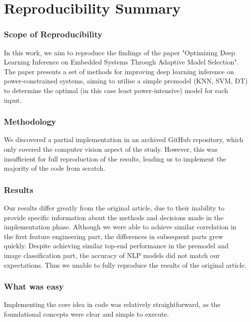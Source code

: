 \section*{Reproducibility Summary}


\subsubsection{Scope of Reproducibility}
In this work, we aim to reproduce the findings of the paper "Optimizing Deep Learning Inference on Embedded Systems Through Adaptive Model Selection"\supercite{marco2019optimizing}. The paper presents a set of methods for improving deep learning inference on power-constrained systems, aiming to utilise a simple premodel (KNN, SVM, DT) to determine the optimal (in this case least power-intensive) model for each input.

\subsubsection{Methodology}
We discovered a partial implementation in an archived GitHub repository, which only covered the computer vision aspect of the study. However, this was insufficient for full reproduction of the results, leading us to implement the majority of the code from scratch.

\subsubsection{Results}
Our results differ greatly from the original article, due to their inability to provide specific information about the methods and decisions made in the implementation phase. Although we were able to achieve similar correlation in the first feature engineering part, the differences in subsequent parts grew quickly. Despite achieving similar top-end performance in the premodel and image classification part, the accuracy of NLP models did not match our expectations. Thus we unable to fully reproduce the results of the original article.

\subsubsection{What was easy}
Implementing the core idea in code was relatively straightforward, as the foundational concepts were clear and simple to execute.

